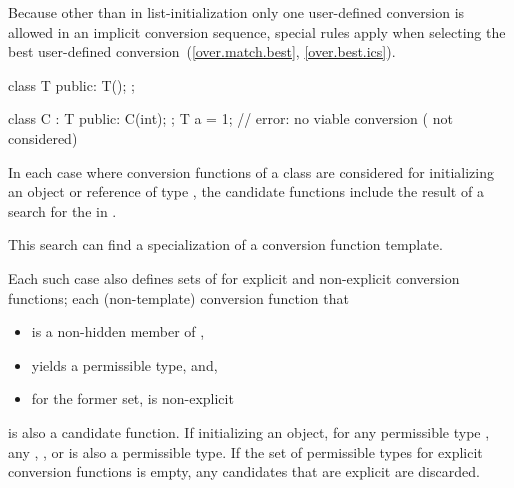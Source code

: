 \pnum
Because other than in list-initialization only one user-defined conversion
is allowed
in an
implicit conversion sequence, special rules apply when selecting
the best user-defined conversion~(\ref{over.match.best},
\ref{over.best.ics}).
\begin{example}
\begin{codeblock}
class T {
public:
  T();
};

class C : T {
public:
  C(int);
};
T a = 1;            // error: no viable conversion ( not considered)
\end{codeblock}
\end{example}

\pnum
In each case where conversion functions of a class  are considered
for initializing an object or reference of type ,
the candidate functions include the result of a search
for the  
in .
\begin{note}
This search can find a specialization of
a conversion function template.
\end{note}
Each such case also defines sets of 
for explicit and non-explicit conversion functions;
each (non-template) conversion function
that
\begin{itemize}
\item is a non-hidden member of ,
\item yields a permissible type, and,
\item for the former set, is non-explicit
\end{itemize}
is also a candidate function.
If initializing an object, for any permissible type \cv{} , any
 ,  , or  
is also a permissible type.
If the set of permissible types for explicit conversion functions is empty,
any candidates that are explicit are discarded.


